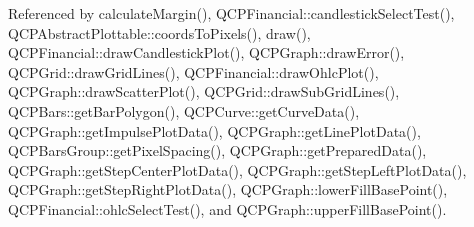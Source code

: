 Referenced by calculate\+Margin(), Q\+C\+P\+Financial\+::candlestick\+Select\+Test(), Q\+C\+P\+Abstract\+Plottable\+::coords\+To\+Pixels(), draw(), Q\+C\+P\+Financial\+::draw\+Candlestick\+Plot(), Q\+C\+P\+Graph\+::draw\+Error(), Q\+C\+P\+Grid\+::draw\+Grid\+Lines(), Q\+C\+P\+Financial\+::draw\+Ohlc\+Plot(), Q\+C\+P\+Graph\+::draw\+Scatter\+Plot(), Q\+C\+P\+Grid\+::draw\+Sub\+Grid\+Lines(), Q\+C\+P\+Bars\+::get\+Bar\+Polygon(), Q\+C\+P\+Curve\+::get\+Curve\+Data(), Q\+C\+P\+Graph\+::get\+Impulse\+Plot\+Data(), Q\+C\+P\+Graph\+::get\+Line\+Plot\+Data(), Q\+C\+P\+Bars\+Group\+::get\+Pixel\+Spacing(), Q\+C\+P\+Graph\+::get\+Prepared\+Data(), Q\+C\+P\+Graph\+::get\+Step\+Center\+Plot\+Data(), Q\+C\+P\+Graph\+::get\+Step\+Left\+Plot\+Data(), Q\+C\+P\+Graph\+::get\+Step\+Right\+Plot\+Data(), Q\+C\+P\+Graph\+::lower\+Fill\+Base\+Point(), Q\+C\+P\+Financial\+::ohlc\+Select\+Test(), and Q\+C\+P\+Graph\+::upper\+Fill\+Base\+Point().


